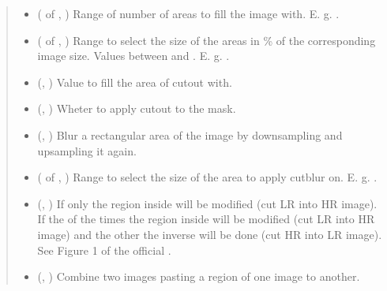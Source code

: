 \documentclass[letterpaper,10pt,english]{sphinxmanual}
\begin{document}
\begin{fulllineitems}
\begin{quote}
\begin{description}
\begin{itemize}
\item {} 
 ( of , ) \textendash{} Range of number of areas to fill the image with. E. g. .

\item {} 
 ( of , ) \textendash{} Range to select the size of the areas in \% of the corresponding image size. Values between  and .
E. g. .

\item {} 
 (, ) \textendash{} Value to fill the area of cutout with.

\item {} 
 (, ) \textendash{} Wheter to apply cutout to the mask.

\item {} 
 (, ) \textendash{} Blur a rectangular area of the image by downsampling and upsampling it again.

\item {} 
 ( of , ) \textendash{} Range to select the size of the area to apply cutblur on. E. g. .

\item {} 
 (, ) \textendash{} If  only the region inside will be modified (cut LR into HR image). If  the  of the
times the region inside will be modified (cut LR into HR image) and the other  the inverse will be
done (cut HR into LR image). See Figure 1 of the official .

\item {} 
 (, ) \textendash{} Combine two images pasting a region of one image to another.


\end{itemize}
\end{description}
\end{quote}
\end{fulllineitems}
\end{document}

